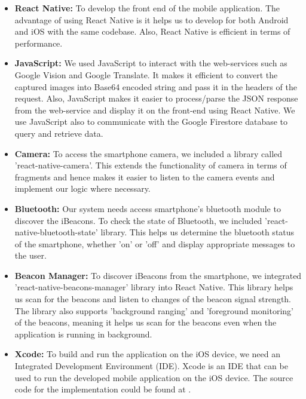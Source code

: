\documentclass[12pt]{article}
\begin{document}
\begin{itemize}
  \item \textbf{React Native:} To develop the front end of the mobile application. The advantage of using React Native is it helps us to develop for both Android and iOS with the same codebase. Also, React Native is efficient in terms of performance.
  
   \item \textbf{JavaScript:} We used JavaScript to interact with the web-services such as Google Vision and Google Translate. It makes it efficient to convert the captured images into Base64 encoded string and pass it in the headers of the request. Also, JavaScript makes it easier to process/parse the JSON response from the web-service and display it on the front-end using React Native. We use JavaScript also to communicate with the Google Firestore database to query and retrieve data.
  
      \item \textbf{Camera:} To access the smartphone camera, we included a library called 'react-native-camera'. This extends the functionality of camera in terms of fragments and hence makes it easier to listen to the camera events and implement our logic where necessary.
      
        \item \textbf{Bluetooth:} Our system needs access smartphone's bluetooth module to discover the iBeacons. To check the state of Bluetooth, we included 'react-native-bluetooth-state' library. This helps us determine the bluetooth status of the smartphone, whether 'on' or 'off' and display appropriate messages to the user.
        
        \item \textbf{Beacon Manager:} To discover iBeacons from the smartphone, we integrated 'react-native-beacons-manager' library into React Native. This library helps us scan for the beacons and listen to changes of the beacon signal strength. The library also supports 'background ranging' and 'foreground monitoring' of the beacons, meaning it helps us scan for the beacons even when the application is running in background. 
      
      \item \textbf{Xcode:} To build and run the application on the iOS device, we need an Integrated Development Environment (IDE). Xcode is an IDE that can be used to run the developed mobile application on the iOS device. The source code for the implementation could be found at \cite{git}.
      
 \end{itemize}
 
\end{document}
